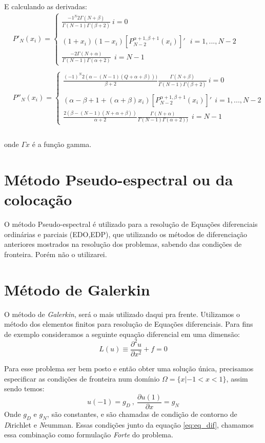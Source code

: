  E calculando as derivadas:
 \begin{align}
  & P'_{N}(x_i)= 
\begin{cases}
 \frac{-1^{N}2\Gamma(N+ \beta)}{\Gamma(N-1)\Gamma(\beta+2)} \ i =0\\ \\
 (1+x_i)(1-x_i)[P^{\alpha+1,\beta+1}_{N-2}(x_i)]' \ \ \ i= 1,...,N-2\\ 
 \frac{-2\Gamma(N+\alpha)}{\Gamma(N-1)\Gamma(\alpha +2)} \ \ i = N-1
\end{cases}\\ \\
  & P''_{N}(x_i)= 
\begin{cases}
 \frac{(-1)^N 2(\alpha -(N-1)(Q+\alpha+\beta)))}{\beta + 2}\frac{\Gamma(N+\beta)}{\Gamma(N-1)\Gamma(\beta + 2)}\ i =0\\  \\
(\alpha -\beta +1+(\alpha+\beta)x_i)[P^{\alpha+1,\beta+1}_{N-2}(x_i)]'\ \ i= 1,...,N-2\\
\frac{2(\beta -(N-1)(N + \alpha + \beta))}{\alpha + 2}\frac{\Gamma(N+\alpha)}{\Gamma(N-1)\Gamma(\alpha+2))} \ \ i = N-1
\end{cases}\\
 \end{align}\\
 onde $\Gamma{x}$ é a função gamma.
 
\section{Método Pseudo-espectral ou da colocação}
 O método Pseudo-espectral é utilizado para a resolução de Equações diferenciais ordinárias e parciais (EDO,EDP), que utilizando os métodos de diferenciação anteriores mostrados na resolução dos problemas, sabendo das condições de fronteira. Porém não o utilizarei.
\section{Método de Galerkin}
 O método de \emph{Galerkin}, será o mais utilizado daqui pra frente. Utilizamos o método dos elementos finitos para resolução de Equações diferenciais. Para fins de exemplo consideramos a seguinte equação diferencial em uma dimensão:
 \begin{equation}\label{eq:eq_dif}
 L(u) \equiv \frac{\partial^2 u}{\partial x^2} + f = 0
 \end{equation}
 
 Para esse problema ser bem posto e então obter uma solução única, precisamos especificar as condições de fronteira num domínio $\Omega = \{x| -1 < x < 1\}$, assim sendo temos:
 \begin{equation}
 u(-1)=g_D\ ,\ \frac{\partial u(1)}{\partial x} = g_N
 \end{equation}
 Onde $g_D$ e $g_N$, são constantes, e são chamadas de condição de contorno de \emph{D}irichlet e \emph{N}eumman. Essas condições junto da equação \eqref{eq:eq_dif}, chamamos essa combinação como formulação \emph{Forte} do problema.
